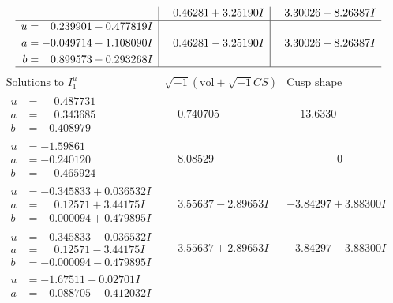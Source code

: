 \documentclass[1p]{elsarticle_modified}
\theoremstyle{definition}
\newcommand{\I}{\sqrt{-1}}
\begin{document}
$$\begin{array}{c|c|c}
 & \phantom{-}0.46281 + 3.25190 I & \phantom{-}3.30026 - 8.26387 I \\ \hline\begin{aligned}
u &= \phantom{-}0.239901 - 0.477819 I \\
a &= -0.049714 - 1.108090 I \\
b &= \phantom{-}0.899573 - 0.293268 I\end{aligned}
 & \phantom{-}0.46281 - 3.25190 I & \phantom{-}3.30026 + 8.26387 I\\
 \hline 
 \end{array}$$\newpage$$\begin{array}{c|c|c}  
\text{Solutions to }I^u_{1}& \I (\text{vol} + \sqrt{-1}CS) & \text{Cusp shape}\\
 \hline 
\begin{aligned}
u &= \phantom{-}0.487731\phantom{ +0.000000I} \\
a &= \phantom{-}0.343685\phantom{ +0.000000I} \\
b &= -0.408979\phantom{ +0.000000I}\end{aligned}
 & \phantom{-}0.740705\phantom{ +0.000000I} & \phantom{-}13.6330\phantom{ +0.000000I} \\ \hline\begin{aligned}
u &= -1.59861\phantom{ +0.000000I} \\
a &= -0.240120\phantom{ +0.000000I} \\
b &= \phantom{-}0.465924\phantom{ +0.000000I}\end{aligned}
 & \phantom{-}8.08529\phantom{ +0.000000I} & \phantom{-0.000000 } 0 \\ \hline\begin{aligned}
u &= -0.345833 + 0.036532 I \\
a &= \phantom{-}0.12571 + 3.44175 I \\
b &= -0.000094 + 0.479895 I\end{aligned}
 & \phantom{-}3.55637 - 2.89653 I & -3.84297 + 3.88300 I \\ \hline\begin{aligned}
u &= -0.345833 - 0.036532 I \\
a &= \phantom{-}0.12571 - 3.44175 I \\
b &= -0.000094 - 0.479895 I\end{aligned}
 & \phantom{-}3.55637 + 2.89653 I & -3.84297 - 3.88300 I \\ \hline\begin{aligned}
u &= -1.67511 + 0.02701 I \\
a &= -0.088705 - 0.412032 I \\

\end{aligned}
\end{array}$$
\end{document}
